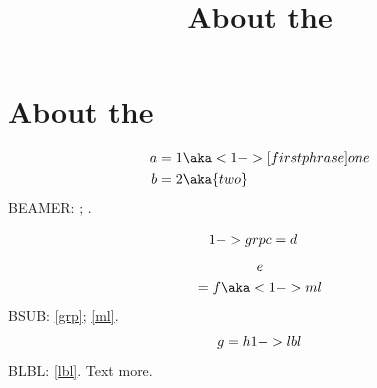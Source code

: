 \documentclass{beamer}
\title{About the \eq{one}}
\begin{document}
\section{About the }
\begin{frame}
\begin{align} a&=1 \aka<1->[first phrase]{one} \\ b&=2 \aka{two} \end{align}
BEAMER: ; .
\end{frame}
\begin{frame}
\begin{subequations}\label<1->{grp}
\begin{align} c&=d \label{three} \end{align}
\end{subequations}
\begin{multline} e\\=f \aka<1->{ml} \end{multline}
BSUB: \eqref{grp}; \eqref{ml}.
\begin{equation} g=h \label<1->{lbl} \end{equation}
BLBL: \eqref{lbl}.
Text \pause more.
\end{frame}
\end{document}
